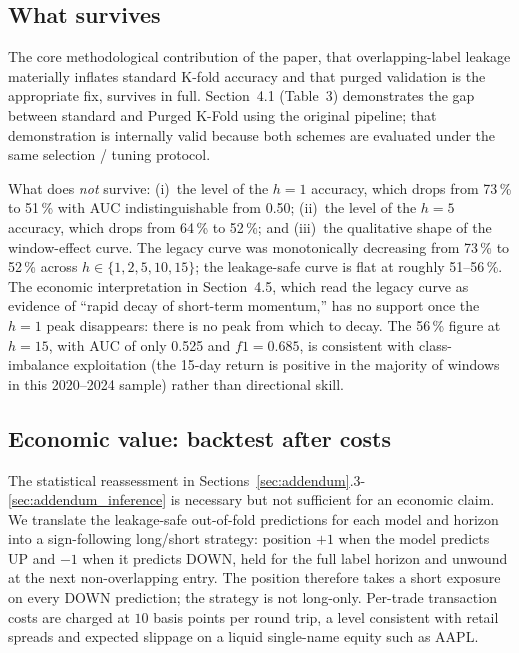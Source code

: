 \documentclass{rQUF2e}
\begin{document}
\subsection{What survives}

The core methodological contribution of the paper, that
overlapping-label leakage materially inflates standard K-fold
accuracy and that purged validation is the appropriate
fix, survives in full. Section~4.1 (Table~3) demonstrates the
gap between standard and Purged K-Fold using the original
pipeline; that demonstration is internally valid because both
schemes are evaluated under the same selection / tuning protocol.

\noindent What does \emph{not} survive: (i)~the level of the
$h=1$ accuracy, which drops from 73\,\% to 51\,\% with AUC
indistinguishable from 0.50; (ii)~the level of the $h=5$
accuracy, which drops from 64\,\% to 52\,\%; and
(iii)~the qualitative shape of the window-effect curve. The
legacy curve was monotonically decreasing from 73\,\% to 52\,\%
across $h \in \{1,2,5,10,15\}$; the leakage-safe curve is flat at
roughly 51--56\,\%. The economic interpretation in Section~4.5,
which read the legacy curve as evidence of ``rapid decay of
short-term momentum,'' has no support once the $h=1$ peak
disappears: there is no peak from which to decay. The 56\,\%
figure at $h=15$, with AUC of only 0.525 and $f1=0.685$, is
consistent with class-imbalance exploitation (the 15-day return
is positive in the majority of windows in this 2020--2024
sample) rather than directional skill.

\subsection{Economic value: backtest after costs}
\label{sec:addendum_backtest}

The statistical reassessment in
Sections~\ref{sec:addendum}.3-\ref{sec:addendum_inference} is
necessary but not sufficient for an economic claim. We translate
the leakage-safe out-of-fold predictions for each model and
horizon into a sign-following long/short strategy: position
$+1$ when the model predicts UP and $-1$ when it predicts DOWN,
held for the full label horizon and unwound at the next
non-overlapping entry. The position therefore takes a short
exposure on every DOWN prediction; the strategy is not
long-only. Per-trade transaction costs are charged at
$10$ basis points per round trip, a level consistent with retail
spreads and expected slippage on a liquid single-name equity such
as AAPL.
\end{document}
